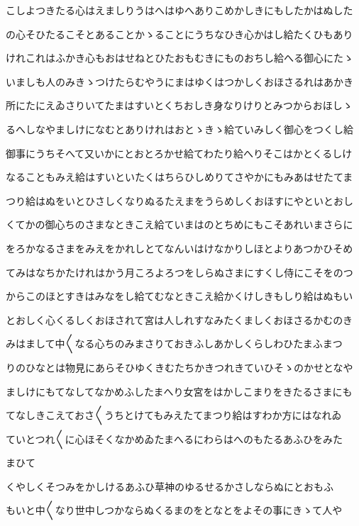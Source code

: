 \documentclass[a4paper,11pt,landscape]{ltjtarticle}
\begin{document}
\par\medskip
こしよつきたる心はえましりうはへはゆへありこめかしきにもしたかはぬした
\par\medskip
の心そひたるこそとあることかゝることにうちなひき心かはし給たくひもあり
\par\medskip
けれこれはふかき心もおはせねとひたおもむきにものおちし給へる御心にたゝ
\par\medskip
いましも人のみきゝつけたらむやうにまはゆくはつかしくおほさるれはあかき
\par\medskip
所にたにえゐさりいてたまはすいとくちおしき身なりけりとみつからおほしゝ
\par\medskip
るへしなやましけになむとありけれはおとゝきゝ給ていみしく御心をつくし給
\par\medskip
御事にうちそへて又いかにとおとろかせ給てわたり給へりそこはかとくるしけ
\par\medskip
なることもみえ給はすいといたくはちらひしめりてさやかにもみあはせたてま
\par\medskip
つり給はぬをいとひさしくなりぬるたえまをうらめしくおほすにやといとおし
\par\medskip
くてかの御心ちのさまなときこえ給ていまはのとちめにもこそあれいまさらに
\par\medskip
をろかなるさまをみえをかれしとてなんいはけなかりしほとよりあつかひそめ
\par\medskip
てみはなちかたけれはかう月ころよろつをしらぬさまにすくし侍にこそをのつ
\par\medskip
からこのほとすきはみなをし給てむなときこえ給かくけしきもしり給はぬもい
\par\medskip
とおしく心くるしくおほされて宮は人しれすなみたくましくおほさるかむのき
\par\medskip
みはまして中〱なる心ちのみまさりておきふしあかしくらしわひたまふまつ
\par\medskip
りのひなとは物見にあらそひゆくきむたちかきつれきていひそゝのかせとなや
\par\medskip
ましけにもてなしてなかめふしたまへり女宮をはかしこまりをきたるさまにも
\par\medskip
てなしきこえておさ〱うちとけてもみえたてまつり給はすわか方にはなれゐ
\par\medskip
ていとつれ〱に心ほそくなかめゐたまへるにわらはへのもたるあふひをみた
\par\medskip
まひて
\par\medskip
くやしくそつみをかしけるあふひ草神のゆるせるかさしならぬにとおもふ
\par\medskip
もいと中〱なり世中しつかならぬくるまのをとなとをよその事にきゝて人や
\end{document}
